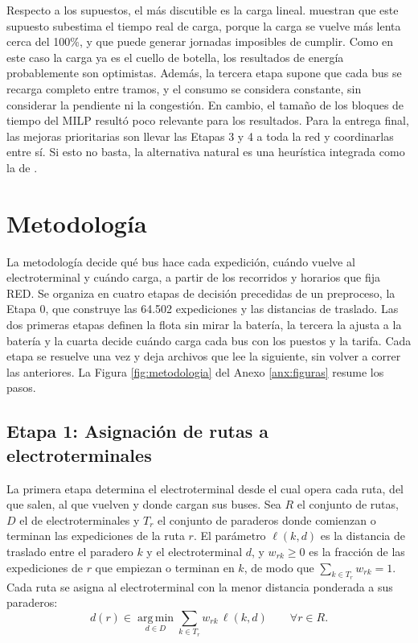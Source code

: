 Respecto a los supuestos, el más discutible es la carga lineal.  muestran que este supuesto subestima el tiempo real de carga, porque la carga se vuelve más lenta cerca del 100\%, y que puede generar jornadas imposibles de cumplir. Como en este caso la carga ya es el cuello de botella, los resultados de energía probablemente son optimistas. Además, la tercera etapa supone que cada bus se recarga completo entre tramos, y el consumo se considera constante, sin considerar la pendiente ni la congestión. En cambio, el tamaño de los bloques de tiempo del MILP resultó poco relevante para los resultados. Para la entrega final, las mejoras prioritarias son llevar las Etapas 3 y 4 a toda la red y coordinarlas entre sí. Si esto no basta, la alternativa natural es una heurística integrada como la de .

\section{Metodología}

La metodología decide qué bus hace cada expedición, cuándo vuelve al electroterminal y cuándo carga, a partir de los recorridos y horarios que fija RED. Se organiza en cuatro etapas de decisión precedidas de un preproceso, la Etapa 0, que construye las 64.502 expediciones y las distancias de traslado. Las dos primeras etapas definen la flota sin mirar la batería, la tercera la ajusta a la batería y la cuarta decide cuándo carga cada bus con los puestos y la tarifa. Cada etapa se resuelve una vez y deja archivos que lee la siguiente, sin volver a correr las anteriores. La Figura \ref{fig:metodologia} del Anexo \ref{anx:figuras} resume los pasos.




\subsection{Etapa 1: Asignación de rutas a electroterminales}
\label{sec:etapa1}

La primera etapa determina el electroterminal desde el cual opera cada ruta, del que salen, al que vuelven y donde cargan sus buses. Sea $R$ el conjunto de rutas, $D$ el de electroterminales y $T_r$ el conjunto de paraderos donde comienzan o terminan las expediciones de la ruta $r$. El parámetro $\ell(k,d)$ es la distancia de traslado entre el paradero $k$ y el electroterminal $d$, y $w_{rk} \geq 0$ es la fracción de las expediciones de $r$ que empiezan o terminan en $k$, de modo que $\sum_{k \in T_r} w_{rk} = 1$. Cada ruta se asigna al electroterminal con la menor distancia ponderada a sus paraderos:
\begin{equation}
    d(r) \in \operatorname*{arg\,min}_{d \in D} \sum_{k \in T_r} w_{rk}\,\ell(k,d)
    \qquad \forall r \in R.
\end{equation}

